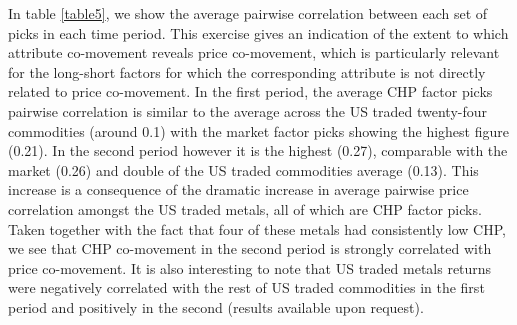 \documentclass[12pt,]{article}
\begin{document}
In table \ref{table5}, we show the average pairwise correlation between
each set of picks in each time period. This exercise gives an indication
of the extent to which attribute co-movement reveals price co-movement,
which is particularly relevant for the long-short factors for which the
corresponding attribute is not directly related to price co-movement. In
the first period, the average CHP factor picks pairwise correlation is
similar to the average across the US traded twenty-four commodities
(around 0.1) with the market factor picks showing the highest figure
(0.21). In the second period however it is the highest (0.27),
comparable with the market (0.26) and double of the US traded
commodities average (0.13). This increase is a consequence of the
dramatic increase in average pairwise price correlation amongst the US
traded metals, all of which are CHP factor picks. Taken together with
the fact that four of these metals had consistently low CHP, we see that
CHP co-movement in the second period is strongly correlated with price
co-movement. It is also interesting to note that US traded metals
returns were negatively correlated with the rest of US traded
commodities in the first period and positively in the second (results
available upon request).
\end{document}
